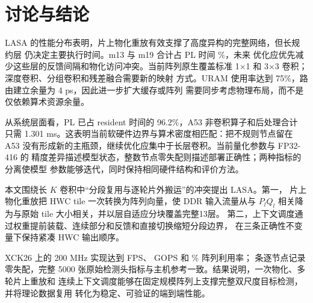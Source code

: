 \section{讨论与结论}
\label{sec:conclusion}

LASA 的性能分布表明，片上物化重放有效支撑了高度异构的完整网络，但长规约层
仍决定主要执行时间。m13 与 m19 合计占 PL 时间 \LongLayerPLShare{}\%，未来
优化应优先减少这些层的反馈间隔和物化访问冲突。当前阵列原生覆盖标准
1$\times$1 和 3$\times$3 卷积；深度卷积、分组卷积和残差融合需要新的映射
方式。URAM 使用率达到 75\%，路由建立余量为 4 ps，因此进一步扩大缓存或阵列
需要同步考虑物理布局，而不是仅依赖算术资源余量。

从系统层面看，PL 已占 resident 时间的 96.2\%，A53 非卷积算子和后处理合计
只需 1.301 ms。这表明当前软硬件边界与算术密度相匹配：把不规则节点留在 A53
没有形成新的主瓶颈，继续优化应集中于长层卷积。当前量化参数与 FP32-416 的
精度差异描述模型状态，整数节点零失配则描述部署正确性；两种指标的分离使模型
参数能够迭代，同时保持相同硬件结构和评价方法。

本文围绕长 $K$ 卷积中“分段复用与逐轮片外搬运”的冲突提出 LASA。第一，
片上物化重放把 HWC tile 一次转换为阵列向量，使 DDR 输入流量从与
$P_lQ_l$ 相关降为与原始 tile 大小相关，并以层自适应分块覆盖完整13层。
第二，上下文调度通过权重提前装载、连续部分和反馈和直接切换缩短分段边界，
在三条正确性不变量下保持紧凑 HWC 输出顺序。

XCK26 上的 200 MHz 实现达到 \ResidentFPS{} FPS、\PLEffectiveGOPS{} GOPS 和
\ArrayUtilization{}\% 阵列利用率；\NodeRecords{} 条逐节点记录零失配，完整
5000 张原始检测头指标与主机参考一致。结果说明，一次物化、多轮片上重放和
连续上下文调度能够在固定规模阵列上支撑完整双尺度目标检测，并将理论数据复用
转化为稳定、可验证的端到端性能。
